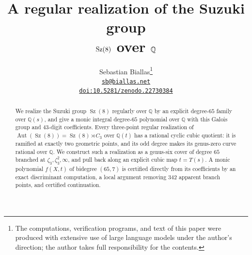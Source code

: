 \documentclass[11pt]{article}
\title{A regular realization of the Suzuki group\texorpdfstring{\\$\Sz(8)$ over $\Q$}{ Sz(8) over Q}}
\author{Sebastian Biallas\thanks{The computations, verification programs,
and text of this paper were produced with extensive use of large language
models under the author's direction; the author takes full responsibility
for the contents.}\\
\normalsize\href{mailto:sb@biallas.net}{\texttt{sb@biallas.net}}\\[-0.1ex]
\normalsize\href{https://doi.org/10.5281/zenodo.22730384}%
{\texttt{doi:10.5281/zenodo.22730384}}}
\date{}
\newcommand{\Q}{\mathbb{Q}}
\newcommand{\Sz}{\operatorname{Sz}}
\newcommand{\Aut}{\operatorname{Aut}}
\theoremstyle{remark}
\begin{document}
\maketitle
\begin{abstract}
We realize the Suzuki group $\Sz(8)$ regularly over $\Q$ by an explicit
degree-$65$ family over $\Q(s)$, and give a monic integral degree-$65$
polynomial over $\Q$ with this Galois group and $43$-digit coefficients.
Every three-point regular realization
of $\Aut(\Sz(8))=\Sz(8)\rtimes C_3$ over $\Q(t)$ has a rational cyclic
cubic quotient: it is ramified at exactly two geometric points, and its
odd degree makes its genus-zero curve rational over $\Q$.
We construct such a realization as a genus-six cover of degree $65$
branched at $\zeta_3,\zeta_3^2,\infty$, and pull back along an explicit
cubic map $t=T(s)$. A monic polynomial $f(X,t)$ of bidegree $(65,7)$
is certified directly from its coefficients by an exact discriminant
computation, a local argument removing $342$ apparent branch points,
and certified continuation.
\end{abstract}
\begingroup\small
\tableofcontents
\endgroup
\clearpage








\appendix

\clearpage
\begingroup\small


\endgroup
\end{document}
